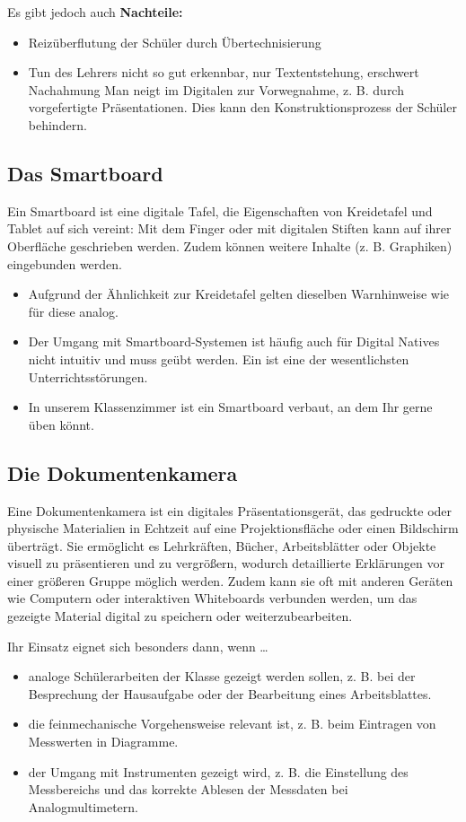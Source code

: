 Es gibt jedoch auch \textbf{Nachteile:}
\begin{itemize}
	\item Reizüberflutung der Schüler durch Übertechnisierung
	\item Tun des Lehrers nicht so gut erkennbar, nur Textentstehung, erschwert Nachahmung
	 Man neigt im Digitalen zur Vorwegnahme, z. B. durch vorgefertigte Präsentationen. Dies kann den Konstruktionsprozess der Schüler behindern.
\end{itemize}

\subsection{Das Smartboard}
Ein Smartboard ist eine digitale Tafel, die Eigenschaften von Kreidetafel und Tablet auf sich vereint: Mit dem Finger oder mit digitalen Stiften kann auf ihrer Oberfläche geschrieben werden. Zudem können weitere Inhalte (z. B. Graphiken) eingebunden werden.

\begin{itemize}
	\item Aufgrund der Ähnlichkeit zur Kreidetafel gelten dieselben Warnhinweise wie für diese analog.
	\item Der Umgang mit Smartboard-Systemen ist häufig auch für Digital Natives nicht intuitiv und muss geübt werden. Ein  ist eine der wesentlichsten Unterrichtsstörungen.
	\item In unserem Klassenzimmer  ist ein Smartboard verbaut, an dem Ihr gerne üben könnt.
\end{itemize} 

\subsection{Die Dokumentenkamera}
Eine Dokumentenkamera ist ein digitales Präsentationsgerät, das gedruckte oder physische Materialien in Echtzeit auf eine Projektionsfläche oder einen Bildschirm überträgt. Sie ermöglicht es Lehrkräften, Bücher, Arbeitsblätter oder Objekte visuell zu präsentieren und zu vergrößern, wodurch detaillierte Erklärungen vor einer größeren Gruppe möglich werden. Zudem kann sie oft mit anderen Geräten wie Computern oder interaktiven Whiteboards verbunden werden, um das gezeigte Material digital zu speichern oder weiterzubearbeiten.

\mip
Ihr Einsatz eignet sich besonders dann, wenn \dots
\begin{itemize}
	\item analoge Schülerarbeiten der Klasse gezeigt werden sollen, z. B. bei der Besprechung der Hausaufgabe oder der Bearbeitung eines Arbeitsblattes.
	\item die feinmechanische Vorgehensweise relevant ist, z. B. beim Eintragen von Messwerten in Diagramme.
	\item der Umgang mit Instrumenten gezeigt wird, z. B. die Einstellung des Messbereichs und das korrekte Ablesen der Messdaten bei Analogmultimetern.
\end{itemize}

